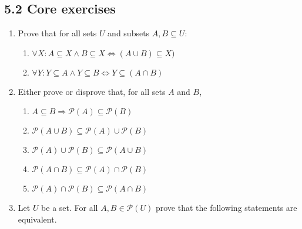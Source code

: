 \documentclass[10pt,\jkfside,a4paper]{article}
\begin{document}
\subsection*{5.2 Core exercises}

\begin{enumerate}

\item Prove that for all sets $U$ and subsets $A, B \subseteq U$:

\begin{enumerate}

\item $\forall X: A \subseteq X \wedge B \subseteq X \Longleftrightarrow (A \cup B) \subseteq X)$



\item $\forall Y: Y \subseteq A \wedge Y \subseteq B \Longleftrightarrow Y \subseteq (A \cap B)$



\end{enumerate}

\item Either prove or disprove that, for all sets $A$ and $B$,

\begin{enumerate}

\item $A \subseteq B \Longrightarrow \mathcal{P}(A) \subseteq \mathcal{P}(B)$



\item $\mathcal{P}(A \cup B) \subseteq \mathcal{P}(A) \cup \mathcal{P}(B)$



\item $\mathcal{P}(A) \cup \mathcal{P}(B) \subseteq \mathcal{P}(A \cup B)$



\item $\mathcal{P}(A \cap B) \subseteq \mathcal{P}(A) \cap \mathcal{P}(B)$



\item $\mathcal{P}(A) \cap \mathcal{P}(B) \subseteq \mathcal{P}(A \cap B)$



\end{enumerate}

\item Let $U$ be a set. For all $A, B \in \mathcal{P}(U)$ prove that the following statements are equivalent.


\end{enumerate}
\end{document}
